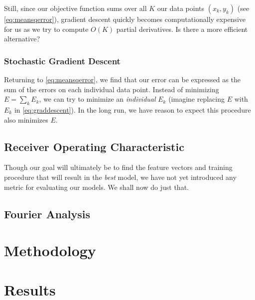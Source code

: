 \documentclass[10pt]{article}
\begin{document}
Still, since our objective function sums over all $K$ our data points $(x_k, y_k)$ (see \cref{eq:meansqerror}), gradient descent quickly becomes computationally expensive for us as we try to compute $O(K)$ partial derivatives. Is there a more efficient alternative?

\subsubsection{Stochastic Gradient Descent}

Returning to \cref{eq:meansqerror}, we find that our error can be expressed as the sum of the errors on each individual data point. Instead of minimizing $E = \sum_k E_k$, we can try to minimize an \emph{individual} $E_k$ (imagine replacing $E$ with $E_k$ in \cref{eq:graddescent}). In the long run, we have reason to expect this procedure also minimizes $E$.


\subsection{Receiver Operating Characteristic}

Though our goal will ultimately be to find the feature vectors and training procedure that will result in the \emph{best} model, we have not yet introduced any metric for evaluating our models. We shall now do just that.


\subsection{Fourier Analysis}


\section{Methodology}



\section{Results}

\end{document}
